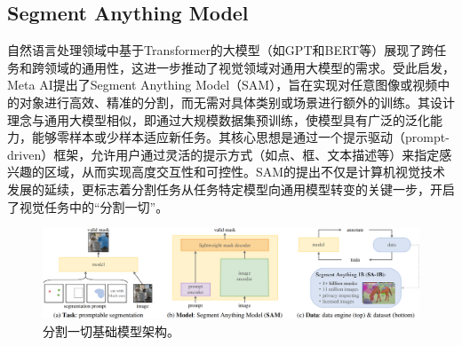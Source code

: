 \documentclass[lang=chs, degree=master, blindreview=false, adobe=false]{yanputhesis}
\begin{document}
\subsection{Segment Anything Model}
自然语言处理领域中基于Transformer的大模型（如GPT和BERT等）展现了跨任务和跨领域的通用性，这进一步推动了视觉领域对通用大模型的需求。受此启发，Meta AI提出了Segment Anything Model\cite{kirillov2023SAM}（SAM），旨在实现对任意图像或视频中的对象进行高效、精准的分割，而无需对具体类别或场景进行额外的训练。其设计理念与通用大模型相似，即通过大规模数据集预训练，使模型具有广泛的泛化能力，能够零样本或少样本适应新任务。其核心思想是通过一个提示驱动（prompt-driven）框架，允许用户通过灵活的提示方式（如点、框、文本描述等）来指定感兴趣的区域，从而实现高度交互性和可控性。SAM的提出不仅是计算机视觉技术发展的延续，更标志着分割任务从任务特定模型向通用模型转变的关键一步，开启了视觉任务中的“分割一切”。
\begin{figure}[htb]
  \centering
  \includegraphics[scale=0.55]{images/SAM1.png}
  \caption{
    分割一切基础模型架构\cite{kirillov2023SAM}。
  }
  \label{fig:SAMfram}
\end{figure}
\end{document}

